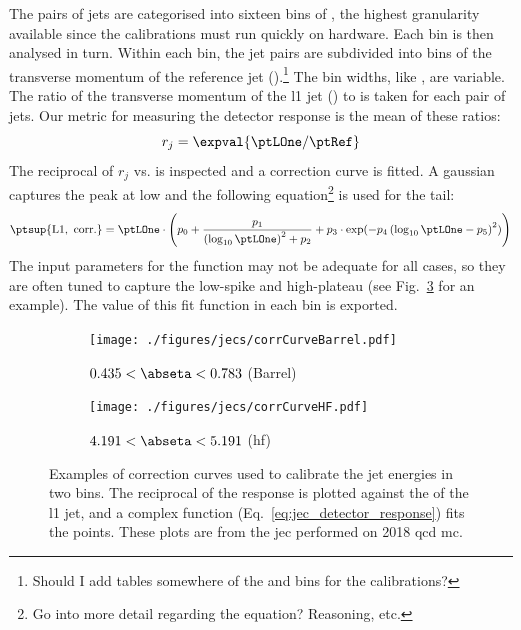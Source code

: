 The pairs of \glspl{jet} are categorised into sixteen bins of \abseta, the highest granularity available since the calibrations must run quickly on hardware. Each bin is then analysed in turn. Within each \abseta bin, the \gls{jet} pairs are subdivided into bins of the transverse momentum of the reference \gls{jet} (\ptRef).\footnote{Should I add tables somewhere of the \ptRef and \abseta bins for the calibrations?} The bin widths, like \abseta, are variable. The ratio of the transverse momentum of the \acrshort{l1} \gls{jet} (\ptLOne) to \ptRef is taken for each pair of \glspl{jet}. Our metric for measuring the detector response is the mean of these ratios:
\begin{equation}
    r_j = \expval{\ptLOne / \ptRef}
    \label{eq:jec_detector_response}
\end{equation}
The reciprocal of $r_j$ vs. \ptLOne is inspected and a correction curve is fitted. A gaussian captures the peak at low \pt and the following equation\footnote{Go into more detail regarding the equation? Reasoning, etc.} is used for the tail:
\begin{equation}
    \ptsup{{\mathrm{L1, \ corr.}}} = \ptLOne \cdot \left( p_0 + \frac{p_1}{ \left(\log_{10} \ptLOne \right) ^2 + p_2 } + p_3 \cdot \exp(-p_4 \left( \log_{10} \ptLOne - p_5 \right)^2) \right)
    \label{eq:corr_curve_jec_tail}
\end{equation}
The input parameters for the function may not be adequate for all cases, so they are often tuned to capture the low-\pt spike and high-\pt plateau (see Fig.~\ref{fig:detector_jecs_corr_curves} for an example). The value of this fit function in each \ptRef bin is exported.


\begin{figure}[htbp]
    \centering
    \begin{subfigure}[b]{0.45\textwidth}
        \texttt{[image: ./figures/jecs/corrCurveBarrel.pdf]}
        \caption{$0.435 < \abseta < 0.783$ (Barrel)}
        \label{fig:detector_jecs_corr_curve_Barrel}
    \end{subfigure}
    \hfill
    \begin{subfigure}[b]{0.45\textwidth}
        \texttt{[image: ./figures/jecs/corrCurveHF.pdf]}
        \caption{$4.191 < \abseta < 5.191$ (\acrshort{hf})}
        \label{fig:detector_jecs_corr_curve_HF}
    \end{subfigure}
\caption[Examples of correction curves used to calibrate the jet energies in two \abseta bins]{Examples of correction curves used to calibrate the \gls{jet} energies in two \abseta bins. The reciprocal of the response is plotted against the \pt of the \acrlong{l1} \gls{jet}, and a complex function (Eq.~\ref{eq:jec_detector_response}) fits the points. These plots are from the \acrlong{jec} performed on 2018 \acrshort{qcd} \acrlong{mc}.}
\label{fig:detector_jecs_corr_curves}
\end{figure}

